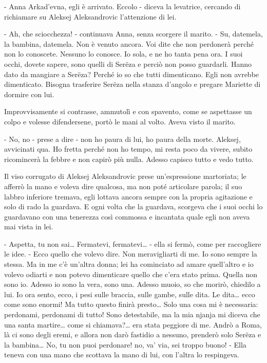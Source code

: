- Anna Arkad'evna, egli è arrivato. Eccolo - diceva la levatrice, cercando di richiamare su Aleksej Aleksandrovic l'attenzione di lei. 

- Ah, che sciocchezza! - continuava Anna, senza scorgere il marito. - Su, datemela, la bambina, datemela. Non è venuto ancora. Voi dite che non perdonerà perché non lo conoscete. Nessuno lo conosce. Io sola, e ne ho tanta pena ora. I suoi occhi, dovete sapere, sono quelli di Serëza e perciò non posso guardarli. Hanno dato da mangiare a Serëza? Perché io so che tutti dimenticano. Egli non avrebbe dimenticato. Bisogna trasferire Serëza nella stanza d'angolo e pregare Mariette di dormire con lui. 

Improvvisamente si contrasse, ammutolì e con spavento, come se aspettasse un colpo e volesse difendersene, portò le mani al volto. Aveva visto il marito. 

- No, no - prese a dire - non ho paura di lui, ho paura della morte. Aleksej, avvicinati qua. Ho fretta perché non ho tempo, mi resta poco da vivere, subito ricomincerà la febbre e non capirò più nulla. Adesso capisco tutto e vedo tutto. 

Il viso corrugato di Aleksej Aleksandrovic prese un'espressione martoriata; le afferrò la mano e voleva dire qualcosa, ma non poté articolare parola; il suo labbro inferiore tremava, egli lottava ancora sempre con la propria agitazione e solo di rado la guardava. E ogni volta che la guardava, scorgeva che i suoi occhi lo guardavano con una tenerezza così commossa e incantata quale egli non aveva mai vista in lei. 

- Aspetta, tu non sai\ldots{} Fermatevi, fermatevi\ldots{} - ella si fermò, come per raccogliere le idee. - Ecco quello che volevo dire. Non meravigliarti di me. Io sono sempre la stessa. Ma in me c'è un'altra donna; lei ha cominciato ad amare quell'altro e io volevo odiarti e non potevo dimenticare quello che c'era stato prima. Quella non sono io. Adesso io sono la vera, sono una. Adesso muoio, so che morirò, chiedilo a lui. Io ora sento, ecco, i pesi sulle braccia, sulle gambe, sulle dita. Le dita\ldots{} ecco come sono enormi! Ma tutto questo finirà presto\ldots{} Solo una cosa mi è necessaria: perdonami, perdonami di tutto! Sono detestabile, ma la mia njanja mi diceva che una santa martire\ldots{} come si chiamava?\ldots{} era stata peggiore di me. Andrò a Roma, là ci sono degli eremi, e allora non darò fastidio a nessuno, prenderò solo Serëza e la bambina\ldots{} No, tu non puoi perdonare! no, va' via, sei troppo buono! - Ella teneva con una mano che scottava la mano di lui, con l'altra lo respingeva. 

